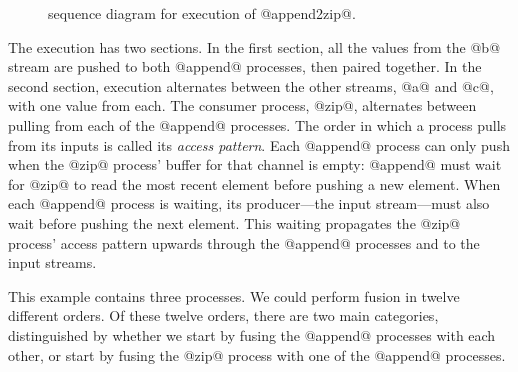 \begin{figure}
\center
\begin{sequencediagram}











\end{sequencediagram}
\caption[Concurrent sequence diagram for two `append2zip']{sequence diagram for execution of @append2zip@. }
\label{figs/swim/append2zip}
\end{figure}


The execution has two sections.
In the first section, all the values from the @b@ stream are pushed to both @append@ processes, then paired together.
In the second section, execution alternates between the other streams, @a@ and @c@, with one value from each.
The consumer process, @zip@, alternates between pulling from each of the @append@ processes.
The order in which a process pulls from its inputs is called its \emph{access pattern}.
Each @append@ process can only push when the @zip@ process' buffer for that channel is empty: @append@ must wait for @zip@ to read the most recent element before pushing a new element.
When each @append@ process is waiting, its producer---the input stream---must also wait before pushing the next element.
This waiting propagates the @zip@ process' access pattern upwards through the @append@ processes and to the input streams.

This example contains three processes.
We could perform fusion in twelve different orders.
Of these twelve orders, there are two main categories, distinguished by whether we start by fusing the @append@ processes with each other, or start by fusing the @zip@ process with one of the @append@ processes.

